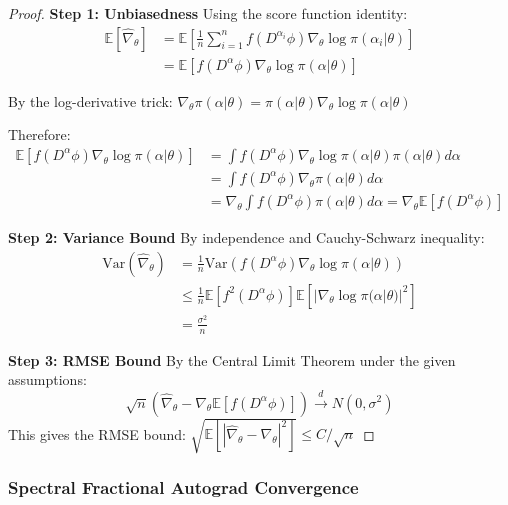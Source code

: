 \begin{proof}
\textbf{Step 1: Unbiasedness}
Using the score function identity:
\begin{align}
\mathbb{E}[\hat{\nabla}_\theta] &= \mathbb{E}\left[\frac{1}{n} \sum_{i=1}^n f(D^{\alpha_i} \phi) \nabla_\theta \log \pi(\alpha_i|\theta)\right] \\
&= \mathbb{E}[f(D^{\alpha} \phi) \nabla_\theta \log \pi(\alpha|\theta)]
\end{align}

By the log-derivative trick: $\nabla_\theta \pi(\alpha|\theta) = \pi(\alpha|\theta) \nabla_\theta \log \pi(\alpha|\theta)$

Therefore:
\begin{align}
\mathbb{E}[f(D^{\alpha} \phi) \nabla_\theta \log \pi(\alpha|\theta)] &= \int f(D^{\alpha} \phi) \nabla_\theta \log \pi(\alpha|\theta) \pi(\alpha|\theta) d\alpha \\
&= \int f(D^{\alpha} \phi) \nabla_\theta \pi(\alpha|\theta) d\alpha \\
&= \nabla_\theta \int f(D^{\alpha} \phi) \pi(\alpha|\theta) d\alpha = \nabla_\theta \mathbb{E}[f(D^{\alpha} \phi)]
\end{align}

\textbf{Step 2: Variance Bound}
By independence and Cauchy-Schwarz inequality:
\begin{align}
\text{Var}(\hat{\nabla}_\theta) &= \frac{1}{n} \text{Var}(f(D^{\alpha} \phi) \nabla_\theta \log \pi(\alpha|\theta)) \\
&\leq \frac{1}{n} \mathbb{E}[f^2(D^{\alpha} \phi)] \mathbb{E}[|\nabla_\theta \log \pi(\alpha|\theta)|^2] \\
&= \frac{\sigma^2}{n}
\end{align}

\textbf{Step 3: RMSE Bound}
By the Central Limit Theorem under the given assumptions:
\begin{equation}
\sqrt{n}(\hat{\nabla}_\theta - \nabla_\theta \mathbb{E}[f(D^{\alpha} \phi)]) \xrightarrow{d} N(0, \sigma^2)
\end{equation}
This gives the RMSE bound: $\sqrt{\mathbb{E}[|\hat{\nabla}_\theta - \nabla_\theta|^2]} \leq C/\sqrt{n}$
\end{proof}

\subsubsection{Spectral Fractional Autograd Convergence}

